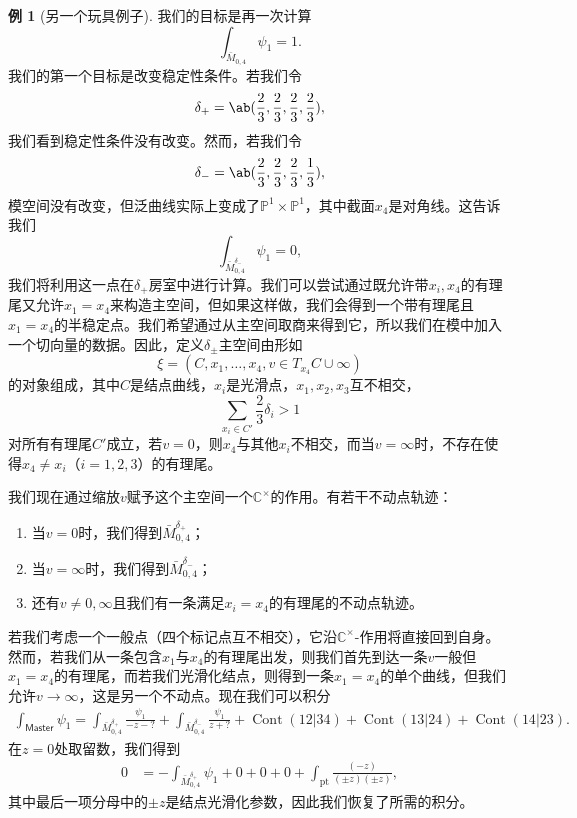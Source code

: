 \documentclass{amsart}
\theoremstyle{definition}
\newtheorem{exm}[thm]{例}
\theoremstyle{remark}
\theoremstyle{plain}
\theoremstyle{definition}
\theoremstyle{remark}
\newcommand{\C}{\mathbb{C}}
\renewcommand{\P}{\mathbb{P}}
\newcommand{\mr}[1]{\mathrm{#1}}
\newcommand{\on}[1]{\operatorname{#1}}
\newcommand{\ms}[1]{\mathsf{#1}}
\newcommand{\1}{\mathbf{1}}
\newcommand{\2}{\mathbf{2}}
\newcommand{\3}{\mathbf{3}}
\begin{document}
\begin{exm}[另一个玩具例子]
    我们的目标是再一次计算
    \[ \int_{\bar{M}_{0,4}} \psi_1 = 1. \]
    我们的第一个目标是改变稳定性条件。若我们令
    \[ \delta_+ = \ab(\frac{2}{3}, \frac{2}{3}, \frac{2}{3}, \frac{2}{3}), \]
    我们看到稳定性条件没有改变。然而，若我们令
    \[ \delta_- = \ab(\frac{2}{3}, \frac{2}{3}, \frac{2}{3}, \frac{1}{3}), \]
    模空间没有改变，但泛曲线实际上变成了\(\P^1 \times \P^1\)，其中截面\(x_4\)是对角线。这告诉我们
    \[ \int_{\bar{M}_{0,4}^{\delta_-}} \psi_1 = 0, \]
    我们将利用这一点在\(\delta_+\)房室中进行计算。我们可以尝试通过既允许带\(x_i, x_4\)的有理尾又允许\(x_1 = x_4\)来构造主空间，但如果这样做，我们会得到一个带有理尾且\(x_1 = x_4\)的半稳定点。我们希望通过从主空间取商来得到它，所以我们在模中加入一个切向量的数据。因此，定义\(\delta_{\pm}\)主空间由形如
    \[ \xi = (C, x_1, \ldots, x_4, v \in T_{x_4} C \cup \infty) \]
    的对象组成，其中\(C\)是结点曲线，\(x_i\)是光滑点，\(x_1, x_2, x_3\)互不相交，
    \[ \sum_{x_i \in C'} \frac{2}{3} \delta_i > 1 \]
    对所有有理尾\(C'\)成立，若\(v = 0\)，则\(x_4\)与其他\(x_i\)不相交，而当\(v = \infty\)时，不存在使得\(x_4 \neq x_i\)（\(i = 1,2,3\)）的有理尾。

    我们现在通过缩放\(v\)赋予这个主空间一个\(\C^{\times}\)的作用。有若干不动点轨迹：
    \begin{enumerate}
        \item 当\(v = 0\)时，我们得到\(\bar{M}_{0,4}^{\delta_+}\)；
        \item 当\(v = \infty\)时，我们得到\(\bar{M}_{0,4}^{\delta_-}\)；
        \item 还有\(v \neq 0,\infty\)且我们有一条满足\(x_i = x_4\)的有理尾的不动点轨迹。
    \end{enumerate}

    若我们考虑一个一般点（四个标记点互不相交），它沿\(\C^{\times}\)-作用将直接回到自身。然而，若我们从一条包含\(x_1\)与\(x_4\)的有理尾出发，则我们首先到达一条\(v\)一般但\(x_1 = x_4\)的有理尾，而若我们光滑化结点，则得到一条\(x_1 = x_4\)的单个曲线，但我们允许\(v \to \infty\)，这是另一个不动点。现在我们可以积分
    \begin{align*}
        \int_{\ms{Master}} \psi_1 = \int_{\bar{M}_{0,4}^{\delta_+}} \frac{\psi_1}{-z-?} + \int_{\bar{M}_{0,4}^{\delta_-}} \frac{\psi_1}{z+?} + \on{Cont}(12|34) + \on{Cont}(13|24) + \on{Cont}(14|23).
    \end{align*}
    在\(z = 0\)处取留数，我们得到
    \begin{align*}
        0 &= - \int_{\bar{M}_{0,4}^{\delta_+}} \psi_1 + 0 + 0 + 0 + \int_{\mr{pt}} \frac{(-z)}{(\pm z)(\pm z)},
    \end{align*}
    其中最后一项分母中的\(\pm z\)是结点光滑化参数，因此我们恢复了所需的积分。
\end{exm}
\end{document}
